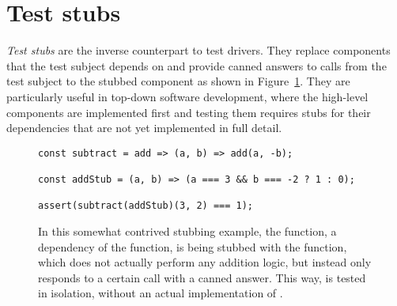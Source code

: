 \section{Test stubs}
\textit{Test stubs} are the inverse counterpart to test drivers.
They replace components that the test subject depends on
and provide canned answers to calls from the test subject to the stubbed component
\autocite{MocksArentStubs}
as shown in Figure~\ref{fig:TestStub}.
They are particularly useful in top-down software development,
where the high-level components are implemented first
and testing them requires stubs for their dependencies
that are not yet implemented in full detail.

\begin{figure}
  \begin{verbatim}
const subtract = add => (a, b) => add(a, -b);

const addStub = (a, b) => (a === 3 && b === -2 ? 1 : 0);

assert(subtract(addStub)(3, 2) === 1);
  \end{verbatim}
  \caption{
    In this somewhat contrived stubbing example,
    the  function,
    a dependency of the  function,
    is being stubbed with the  function,
    which does not actually perform any addition logic,
    but instead only responds to a certain call with a canned answer.
    This way,  is tested in isolation,
    without an actual implementation of .
  }\label{fig:TestStub}
\end{figure}
